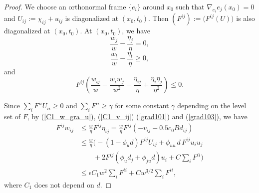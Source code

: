 \documentclass[12pt]{amsart}
\theoremstyle{definition}
\theoremstyle{remark}
\numberwithin{equation}{section}
\begin{document}
\begin{proof}
	
	We choose an orthonormal frame $\{e_i\}$ around $x_0$ such that $\nabla_{e_i} e_j (x_0) = 0$ and $U_{ij} := \chi_{ij} + u_{ij}$ is diagonalized at $(x_0, t_0)$.
	Then $(F^{ij}) := \big(F^{ij}(U)\big)$ is also diagonalized at $(x_0, t_0)$.
	At $(x_0, t_0)$, we have
	\begin{equation}\label{grad101}
	\frac{w_j}{w} - \frac{\eta_j}{\eta} = 0,
	\end{equation}
	\begin{equation}\label{grad102}
	\frac{w_t}{w} - \frac{\eta_t}{\eta} \geq 0,
	\end{equation}
	and
	\begin{equation}\label{grad103}
	F^{ij} \left( \frac{w_{ij}}{w} - \frac{w_i w_j}{w^2} - \frac{\eta_{ij}}{\eta} + \frac{\eta_i \eta_j}{\eta^2} \right) \leq 0.
	\end{equation}
	
	Since $\sum_i F^{ii}U_{ii} \geq 0$ and $\sum_i F^{ii} \geq \gamma$ for some constant $\gamma$ depending on the level set of $F$, by (\ref{C1_w_gra_u}), (\ref{C1_v_ij}) (\ref{grad101}) and (\ref{grad103}), we have
	\begin{equation}\label{F_ij*w_ij_right_ext}
	\begin{aligned}
	F^{ij} w_{ij} 
	&\leq \frac{w}{\eta} F^{ij} \eta_{ij}
	= \frac{w}{\eta} F^{ij} (-v_{ij} - 0.5 c_0 B d_{ij})\\
	&\leq \frac{w}{\eta} \Big( - (1 - \phi_u d) F^{ij} U_{ij} + \phi_{uu}\,d\, F^{ij}u_i u_j  \\
	& \qquad + 2 F^{ij} (\phi_u d_j + \phi_{ju}d) u_i + C \sum_i F^{ii} \Big)\\
	& \leq \epsilon C_1 w^2 \sum_i F^{ii} + C w^{3/2} \sum_i F^{ii},
	\end{aligned}
	\end{equation}
	where $C_1$ does not depend on $d$.
	

\end{proof}
\end{document}
